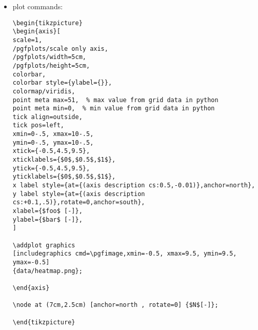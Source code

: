 \begin{itemize}
\item plot commands:

\begin{lstlisting}
\begin{tikzpicture}
\begin{axis}[
scale=1,
/pgfplots/scale only axis,
/pgfplots/width=5cm,
/pgfplots/height=5cm,
colorbar,
colorbar style={ylabel={}},
colormap/viridis,
point meta max=51,  % max value from grid data in python
point meta min=0,  % min value from grid data in python
tick align=outside,
tick pos=left,
xmin=0-.5, xmax=10-.5,
ymin=0-.5, ymax=10-.5,
xtick={-0.5,4.5,9.5},
xticklabels={$0$,$0.5$,$1$},
ytick={-0.5,4.5,9.5},
yticklabels={$0$,$0.5$,$1$},
x label style={at={(axis description cs:0.5,-0.01)},anchor=north},
y label style={at={(axis description cs:+0.1,.5)},rotate=0,anchor=south},
xlabel={$foo$ [-]},
ylabel={$bar$ [-]},
]

\addplot graphics 
[includegraphics cmd=\pgfimage,xmin=-0.5, xmax=9.5, ymin=9.5, ymax=-0.5] 
{data/heatmap.png};

\end{axis}

\node at (7cm,2.5cm) [anchor=north , rotate=0] {$N$[-]};

\end{tikzpicture}
\end{lstlisting}

\end{itemize}

